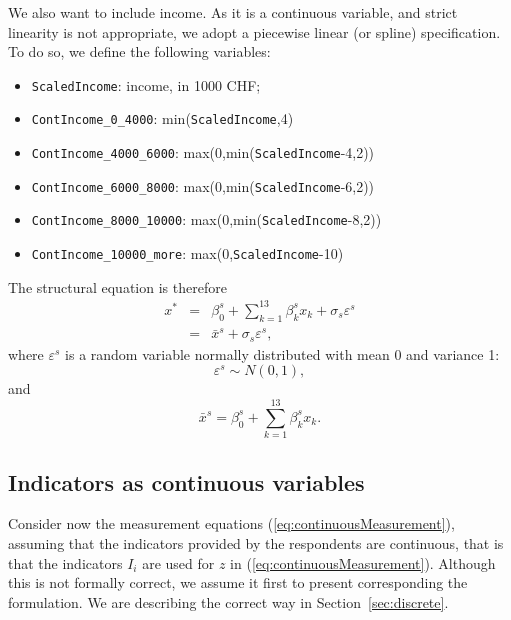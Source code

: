 \documentclass[12pt,a4paper]{article}
\newcommand{\req}[1]{(\ref{#1})}
\begin{document}
We also want to include income. As it is a continuous variable, and
strict linearity is not appropriate, we adopt a piecewise linear (or
spline) specification. To do so, we define the following variables:

\begin{itemize}
\item \lstinline+ScaledIncome+: income, in 1000 CHF;
\item \lstinline+ContIncome_0_4000+:  min(\lstinline+ScaledIncome+,4)
\item \lstinline+ContIncome_4000_6000+: max(0,min(\lstinline+ScaledIncome+-4,2))
\item \lstinline+ContIncome_6000_8000+: max(0,min(\lstinline+ScaledIncome+-6,2))
\item \lstinline+ContIncome_8000_10000+: max(0,min(\lstinline+ScaledIncome+-8,2))
\item \lstinline+ContIncome_10000_more+: max(0,\lstinline+ScaledIncome+-10)
\end{itemize}

The structural equation is therefore
\begin{equation}
\label{eq:x_s}
\begin{array}{rcl}
x^* &=& \beta^s_0 + \sum_{k=1}^{13} \beta^s_k x_k + \sigma_s
\varepsilon^s \\
 &=& \bar{x}^s + \sigma_s \varepsilon^s,
\end{array}
\end{equation}
where $\varepsilon^s$ is a random variable normally distributed with
mean 0 and variance 1: 
\begin{equation}
\varepsilon^s \sim N(0,1),
\end{equation}
and
\begin{equation}
\bar{x}^s = \beta^s_0 + \sum_{k=1}^{13} \beta^s_k x_k.
\end{equation}
\subsection{Indicators as continuous variables}
\label{sec:continuous}
Consider now the measurement equations \req{eq:continuousMeasurement},
assuming that the indicators provided by the respondents are
continuous, that is that the indicators $I_i$ are used for $z$ in \req{eq:continuousMeasurement}. Although this is not formally correct, we assume it first
to present corresponding the formulation. We are describing the correct
way in Section~\ref{sec:discrete}. 
\end{document}
